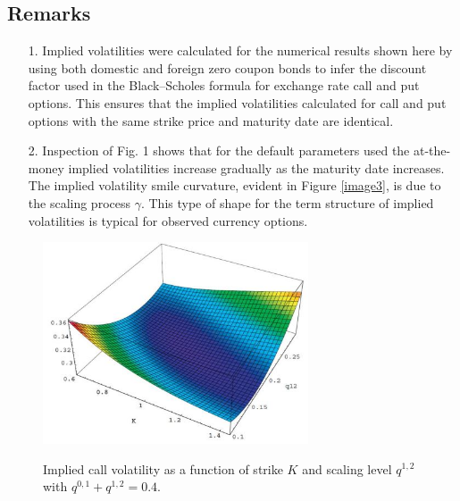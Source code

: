 \documentclass[a4 paper, 12pt]{report}
\theoremstyle{plain}
\begin{document}
\subsection*{Remarks}
\begin{enumerate}
\item[1.] Implied volatilities were calculated for the numerical results shown here by using both domestic and foreign zero coupon bonds to infer the discount factor used in the Black–Scholes formula for exchange rate call and put options. This ensures that the implied volatilities calculated for call and put options with the same strike price and maturity date are identical.

\item[2.] Inspection of Fig. 1 shows that for the default parameters used the at-the- money implied volatilities increase gradually as the maturity date
increases. The implied volatility smile curvature, evident in Figure \ref{image3}, is due to
the scaling process $\gamma$. This type of shape for the term structure of implied volatilities is  typical for observed currency options.
\end{enumerate}
\newpage 
\begin{figure}[hp]
	\centering
		\includegraphics[width=0.70\textwidth]{fig2.JPG}
	\label{image2}
	\caption{Implied call volatility as a function of strike $K$ and scaling level $q^{1,2}$ with $q^{0,1}+q^{1,2} = 0.4.$}
\end{figure}
\end{document}
